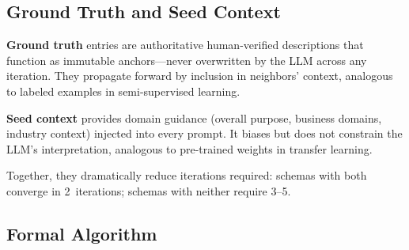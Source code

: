 \documentclass[sigconf, nonacm]{acmart}
\begin{document}
\subsection{Ground Truth and Seed Context}

\textbf{Ground truth} entries are authoritative human-verified descriptions that function as immutable anchors---never overwritten by the LLM across any iteration. They propagate forward by inclusion in neighbors' context, analogous to labeled examples in semi-supervised learning.

\textbf{Seed context} provides domain guidance (overall purpose, business domains, industry context) injected into every prompt. It biases but does not constrain the LLM's interpretation, analogous to pre-trained weights in transfer learning.

Together, they dramatically reduce iterations required: schemas with both converge in 2~iterations; schemas with neither require 3--5.

\subsection{Formal Algorithm}
\end{document}

